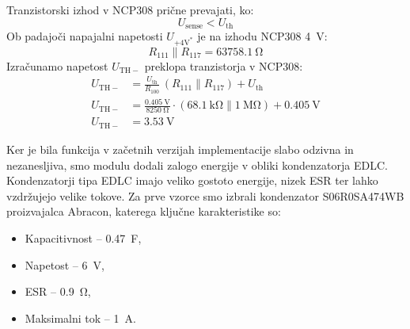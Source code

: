 \documentclass[a4paper,twoside,openright,12pt,slovene]{book}
\begin{document}
Tranzistorski izhod v NCP308 prične prevajati, ko:
\begin{equation}
    U_{\text{sense}} < U_{\text{th}}
\end{equation}
Ob padajoči napajalni napetosti $U_{+4\mathrm{V}^\ast}$ je na izhodu NCP308 \SI{4}{\volt}:
\begin{equation}
    R_{111} \parallel R_{117} = \SI{63758.1}{\ohm}
\end{equation}
Izračunamo napetost $U_{\mathrm{TH}-}$ preklopa tranzistorja v NCP308:
\begin{equation}
\begin{aligned}
    U_{\mathrm{TH}-} &= \frac{U_{\text{th}}}{R_{100}}\,\left(R_{111} \parallel R_{117}\right) + U_{\text{th}} \\
    U_{\mathrm{TH}-} &= \frac{\SI{0.405}{\volt}}{\SI{8250}{\ohm}}\cdot \left(\SI{68.1}{\kilo\ohm} \parallel \SI{1}{\mega\ohm}\right) + \SI{0.405}{\volt} \\
    U_{\mathrm{TH}-} &= \SI{3.53}{\volt}
\end{aligned}
\end{equation}

Ker je bila funkcija v začetnih verzijah implementacije slabo odzivna in nezanesljiva, smo modulu dodali zalogo energije v obliki kondenzatorja EDLC. Kondenzatorji tipa EDLC imajo veliko gostoto energije, nizek ESR ter lahko vzdržujejo velike tokove. Za prve vzorce smo izbrali kondenzator S06R0SA474WB proizvajalca Abracon, katerega ključne karakteristike so:
\begin{itemize}
    \item Kapacitivnost -- \SI{0,47}{\farad},
    \item Napetost -- \SI{6}{\volt},
    \item ESR -- \SI{0,9}{\ohm},
    \item Maksimalni tok -- \SI{1}{\ampere}.
\end{itemize}  
\end{document}
